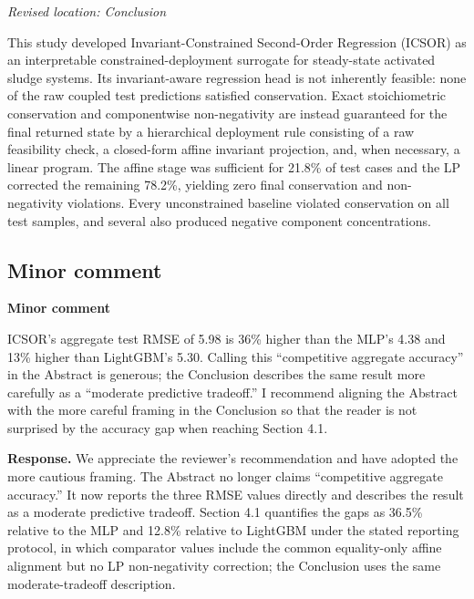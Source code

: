 \documentclass[11pt,a4paper]{article}
\newcommand{\excerptlocation}[1]{\par\noindent\textit{Revised location: #1}\par}
\begin{document}
\excerptlocation{Conclusion}
\begin{revisionexcerpt}
This study developed Invariant-Constrained Second-Order Regression (ICSOR) as an interpretable constrained-deployment surrogate for steady-state activated sludge systems. Its invariant-aware regression head is not inherently feasible: none of the raw coupled test predictions satisfied conservation. Exact stoichiometric conservation and componentwise non-negativity are instead guaranteed for the final returned state by a hierarchical deployment rule consisting of a raw feasibility check, a closed-form affine invariant projection, and, when necessary, a linear program. The affine stage was sufficient for 21.8\% of test cases and the LP corrected the remaining 78.2\%, yielding zero final conservation and non-negativity violations. Every unconstrained baseline violated conservation on all test samples, and several also produced negative component concentrations.
\end{revisionexcerpt}

\subsection*{Minor comment}

\begin{reviewercomment}
\textbf{Minor comment}

ICSOR's aggregate test RMSE of 5.98 is 36\% higher than the MLP's 4.38 and 13\% higher than LightGBM's 5.30. Calling this ``competitive aggregate accuracy'' in the Abstract is generous; the Conclusion describes the same result more carefully as a ``moderate predictive tradeoff.'' I recommend aligning the Abstract with the more careful framing in the Conclusion so that the reader is not surprised by the accuracy gap when reaching Section 4.1.
\end{reviewercomment}

\noindent\textbf{Response.} We appreciate the reviewer's recommendation and have adopted the more cautious framing. The Abstract no longer claims ``competitive aggregate accuracy.'' It now reports the three RMSE values directly and describes the result as a moderate predictive tradeoff. Section 4.1 quantifies the gaps as 36.5\% relative to the MLP and 12.8\% relative to LightGBM under the stated reporting protocol, in which comparator values include the common equality-only affine alignment but no LP non-negativity correction; the Conclusion uses the same moderate-tradeoff description.
\end{document}
